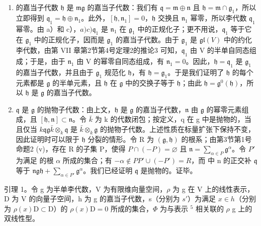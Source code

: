 \begin{enumerate}
\def\labelenumi{\alph{enumi})}
\setcounter{enumi}{3}
\item
   的嘉当子代数 \(\mathfrak{h}\) 是 \(\mathfrak{m}\)\(\mathfrak{g}\) 的嘉当子代数：我们有 \(\mathfrak{q} = \mathfrak{m} \oplus \mathfrak{n}\) 且 \(\mathfrak{h} = \mathfrak{m} \cap \mathfrak{g}_1\)，所以立即得到 \(\mathfrak{q}_1 = \mathfrak{h} \oplus \mathfrak{n}_1\)。此外，\([\mathfrak{h}, \mathfrak{n}_1] = 0\)，\(\mathfrak{h}\) 交换且 \(\mathfrak{n}_1\) 幂零，所以李代数 \(\mathfrak{q}_1\) 幂零。由 a）和 c），\(a)\)\(c)\)\(\mathfrak{q}_1\) 是 \(\mathfrak{n}_1\) 在 \(\mathfrak{g}_1\) 中的正规化子；更不用说，\(\mathfrak{q}_1\) 等于它在 \(\mathfrak{g}_1\) 中的正规化子，因而是 \(\mathfrak{g}_1\) 的嘉当子代数。由于 \(\mathfrak{g}_1\) 是 \(\mathfrak{gl}(V)\) 中的约化李代数，由第 VII 章第2节第4号定理2的推论3 可知，\(\mathfrak{q}_1\) 由 V 的半单自同态组成；于是，由于 \(\mathfrak{n}_1\) 由 V 的幂零自同态组成，有 \(\mathfrak{n}_1 = 0\)。因此，\(\mathfrak{h} = \mathfrak{q}_1\) 是 \(\mathfrak{g}_1\) 的嘉当子代数，并且由于 \(\mathfrak{g}_1\) 规范化 \(\mathfrak{h}\)，有 \(\mathfrak{h} = \mathfrak{g}_1\)。于是我们证明了 \(\mathfrak{h}\) 的每个元素都是 \(\mathfrak{g}\) 的半单元素，且 \(\mathfrak{h}\) 在 \(\mathfrak{g}\) 中的交换子等于 \(\mathfrak{h}\)；由此 \(\mathfrak{h} = \mathfrak{g}^0(\mathfrak{h})\)，所以 \(\mathfrak{h}\) 是 \(\mathfrak{g}\) 的嘉当子代数。
\item
  \(\mathfrak{q}\) 是 \(\mathfrak{g}\) 的抛物子代数：由上文，\(\mathfrak{h}\) 是 \(\mathfrak{g}\) 的嘉当子代数，\(\mathfrak{n}\) 由 \(\mathfrak{g}\) 的幂零元素组成，且 \([\mathfrak{h},\mathfrak{n}]\subset \mathfrak{n}\)。令 \(\bar{k}\) 为 k 的代数闭包；按定义，q 在 g 中是抛物的，当且仅当 \(k\)\(\mathfrak{q}\)\(\mathfrak{g}\)\(\bar{k}\otimes_k\mathfrak{q}\) 是 \(\bar{k}\otimes_k\mathfrak{g}\) 的抛物子代数。上述性质在标量扩张下保持不变，因此证明时可以限于 \(\mathfrak{h}\) 分裂的情形。令 R 为 \((\mathfrak{g},\mathfrak{h})\) 的根系；由第3节第1号命题2 (v)，存在 R 的子集 P，使得 \(P\cap (-P) = \varnothing\) 且 \(\mathfrak{n} = \sum_{\alpha \in P}\mathfrak{g}^{\alpha}\)。令 \(P'\) 为满足  的根 \(\alpha\) 所成的集合；有 \(-\alpha\notin P\)\(P' \cup (-P') = R\)，而  中 n 的正交补 \(\mathfrak{q}\) 等于 \(\mathfrak{n}\)\(\mathfrak{g}\)\(\mathfrak{h} + \sum_{\alpha \in P'}\mathfrak{g}^{\alpha}\)。我们已经证明 \(\mathfrak{q}\) 是抛物的。证毕。
\end{enumerate}

引理 1。令 g 为半单李代数，V 为有限维向量空间，\(\rho\) 为 g 在 V 上的线性表示，D 为 V 的向量子空间，h 为 g 的嘉当子代数，s（分别为 \(s'\)）为满足 \(x \in h\)（分别为 \(\rho(x)\mathrm{D} \subset \mathrm{D}\)）的 \(\rho(x)\mathrm{D} = 0\) 所成的集合，\(\Phi\) 为与表示 \(^{5}\) 相关联的 \(\rho\) g 上的双线性型。

